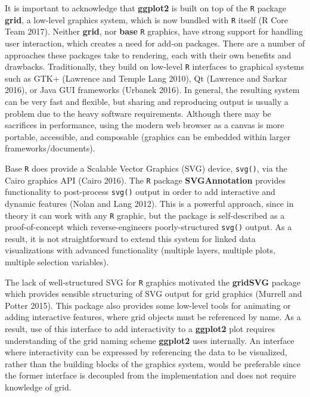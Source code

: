 \documentclass[12pt,]{article}
\theoremstyle{definition}
\theoremstyle{definition}
\theoremstyle{definition}
\theoremstyle{remark}
\begin{document}
It is important to acknowledge that \textbf{ggplot2} is built on top of
the \texttt{R} package \textbf{grid}, a low-level graphics system, which
is now bundled with \texttt{R} itself (R Core Team 2017). Neither
\textbf{grid}, nor \textbf{base} \texttt{R} graphics, have strong
support for handling user interaction, which creates a need for add-on
packages. There are a number of approaches these packages take to
rendering, each with their own benefits and drawbacks. Traditionally,
they build on low-level \texttt{R} interfaces to graphical systems such
as GTK+ (Lawrence and Temple Lang 2010), Qt (Lawrence and Sarkar 2016),
or Java GUI frameworks (Urbanek 2016). In general, the resulting system
can be very fast and flexible, but sharing and reproducing output is
usually a problem due to the heavy software requirements. Although there
may be sacrifices in performance, using the modern web browser as a
canvas is more portable, accessible, and composable (graphics can be
embedded within larger frameworks/documents).

Base \texttt{R} does provide a Scalable Vector Graphics (SVG) device,
\texttt{svg()}, via the Cairo graphics API (Cairo 2016). The \texttt{R}
package \textbf{SVGAnnotation} provides functionality to post-process
\texttt{svg()} output in order to add interactive and dynamic features
(Nolan and Lang 2012). This is a powerful approach, since in theory it
can work with any \texttt{R} graphic, but the package is self-described
as a proof-of-concept which reverse-engineers poorly-structured
\texttt{svg()} output. As a result, it is not straightforward to extend
this system for linked data visualizations with advanced functionality
(multiple layers, multiple plots, multiple selection variables).

The lack of well-structured SVG for \texttt{R} graphics motivated the
\textbf{gridSVG} package which provides sensible structuring of SVG
output for grid graphics (Murrell and Potter 2015). This package also
provides some low-level tools for animating or adding interactive
features, where grid objects must be referenced by name. As a result,
use of this interface to add interactivity to a \textbf{ggplot2} plot
requires understanding of the grid naming scheme \textbf{ggplot2} uses
internally. An interface where interactivity can be expressed by
referencing the data to be visualized, rather than the building blocks
of the graphics system, would be preferable since the former interface
is decoupled from the implementation and does not require knowledge of
grid.
\end{document}
